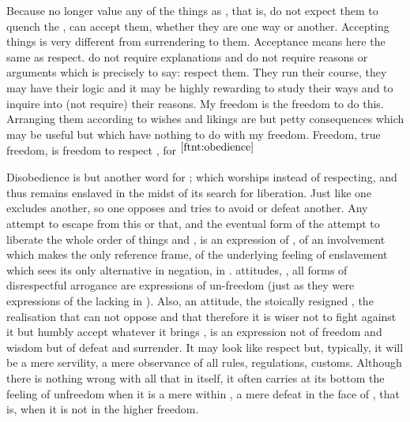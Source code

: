 Because  no longer value any of the  things as ,
that is,  do not expect them to quench the ,  can accept
them, whether they are one way or another.  
%
Accepting things is very different from surrendering to them. Acceptance means
here the same as respect.   do not require explanations and  do not
require reasons or arguments which is precisely to say:  respect them.
They run their course, they may have their logic and it may be highly rewarding
to study their ways and to inquire into (not require) their reasons.  My freedom
is the freedom to do this.  Arranging them according to  wishes and
likings are but petty consequences which may be useful but which have nothing to
do with my freedom.  Freedom, true freedom, is freedom to respect , for $^{\ref{ftnt:obedience}}$

Disobedience is but another word for ;  which
worships instead of respecting, and thus remains enslaved in the midst of its
search for liberation. Just like one  excludes another, so one
 opposes and tries to avoid or defeat another.  Any attempt to escape
from this or that, and the eventual form of the attempt to liberate 
 the whole order of things and , is an expression of
, of an involvement which makes  the only
reference frame, of the underlying feeling of enslavement which sees its only
alternative in negation, in .  attitudes,
, all forms
of disrespectful arrogance are expressions of un-freedom (just as they were
expressions of the lacking  in ).  Also, an
 attitude, the stoically resigned , the
realisation that  can not oppose  and that therefore
it is wiser not to fight against it but humbly accept whatever it brings
, is an expression not of freedom and wisdom but of defeat and surrender.
It may look like respect but, typically, it will be a mere servility, a mere
observance of all rules, regulations, customs.  Although there is nothing wrong
with all that in itself, it often carries at its bottom the feeling of unfreedom
when it is a mere  within , a mere defeat in the face of
, that is, when it is not  in the higher
freedom.


